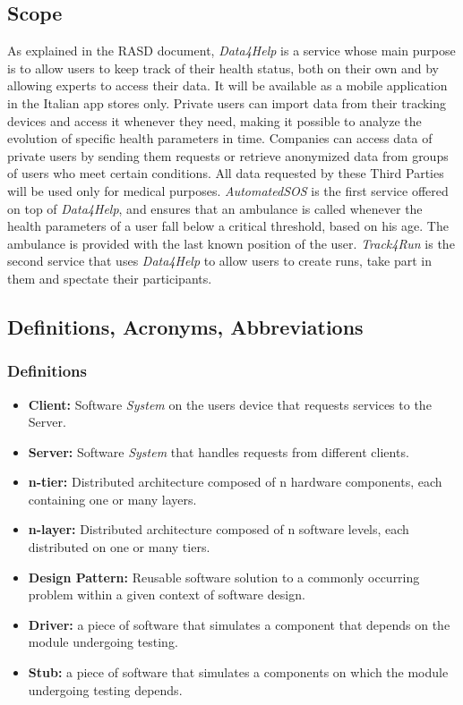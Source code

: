 \documentclass[titlepage]{article}
\begin{document}
	\subsection{Scope}
	As explained in the RASD document, {\it Data4Help} is a service whose main purpose is to allow users to keep track of their health status, both on their own and by allowing experts to access their data. It will be available as a mobile application in the Italian app stores only.
	Private users can import data from their tracking devices and access it whenever they need, making it possible to analyze the evolution of specific health parameters in time.
	Companies can access data of private users by sending them requests or retrieve anonymized data from groups of users who meet certain conditions. All data requested by these Third Parties will be used only for medical purposes.\newline
	\newline
	\textit{{\it AutomatedSOS}} is the first service offered on top of {\it Data4Help}, and ensures that an ambulance is called whenever the health parameters of a user fall below a critical threshold, based on his age. The ambulance is provided with the last known position of the user.\newline
	\newline
	\textit{{\it Track4Run}} is the second service that uses {\it Data4Help} to allow users to create runs, take part in them and spectate their participants. 
	
	\subsection{Definitions, Acronyms, Abbreviations}
	
	
	\subsubsection{Definitions}
	
	\begin{itemize}
		\item {\bf Client: }Software {\it System} on the user\textsc{}s device that requests services to the Server.
		\item {\bf Server: }Software {\it System} that handles requests from different clients.
		\item {\bf n-tier: }Distributed architecture composed of n hardware components, each containing one or many layers.
		\item {\bf n-layer: }Distributed architecture composed of n software levels, each distributed on one or many tiers.
		\item {\bf Design Pattern: }Reusable software solution to a commonly occurring problem within a given context of software design.
		\item {\bf Driver: }a piece of software that simulates a component that depends on the module undergoing testing.
		\item {\bf Stub: }a piece of software that simulates a components on which the module undergoing testing depends.
	\end{itemize}
	
\end{document}
